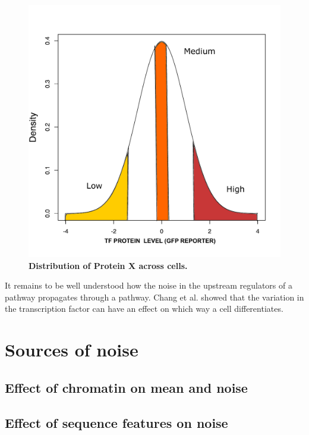 \begin{figure}[t!]  
    \centering
    \includegraphics[width=\linewidth, scale=0.5]{figures/intro/intro_gfp_density_X.pdf}
    \caption[Distribution of Protein X across cells.]{%
        \textbf{Distribution of Protein X across cells.}
    }
    \label{fig:gfpXdensity}
\end{figure}

It remains to be well understood how the noise in the upstream regulators of a pathway propagates through a pathway. Chang et al. \cite {sui_huang} showed that the variation in the transcription factor can have an effect on which way a cell differentiates.


\section{Sources of noise}

\subsection{Effect of chromatin on mean and noise}

\subsection{Effect of sequence features on noise}

